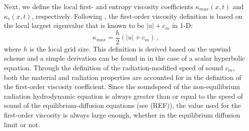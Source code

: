 \documentclass[review]{elsarticle}
\begin{document}
Next, we define the local first- and entropy viscosity coefficients $\kappa_{max}(x,t)$ and $\kappa_e(x,t)$, respectively. Following \cite{valentin}, the first-order viscosity definition is based on the local largest eigenvalue that is known to be $|u| + c_m$ in 1-D:
\begin{equation}
\label{eq:equation8}
\kappa_{max} = \frac{h}{2} \left( |u| + c_m \right) \,,
\end{equation}  
where $h$ is the local grid size. This definition is derived based on the upwind scheme and a simple derivation can be found in \cite{jlg1} in the case of a scalar hyperbolic equation. Through the definition of the radiation-modified speed of sound $c_m$, both the material and radiation properties are accounted for in the definition of the first-order viscosity coefficient. Since the soundspeed of the non-equilibrium radiation hydrodynamic equation is always greater than or equal to the speed of sound of the equilibrium-diffusion equations (see (REF)), the value used for the first-order viscosity is always large enough, whether in the equilibrium diffusion limit or not.
\end{document}
